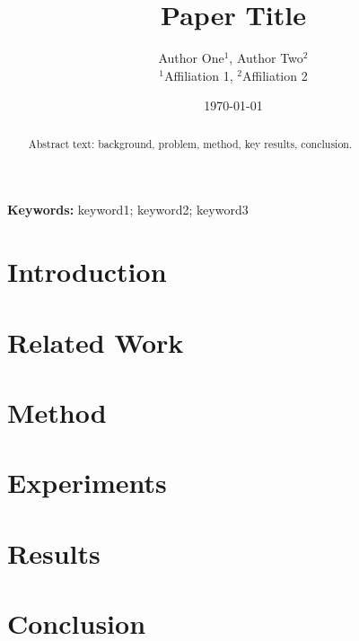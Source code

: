 \documentclass[11pt,a4paper]{article}
\begin{document}
\title{Paper Title}
\author{Author One$^{1}$, Author Two$^{2}$ \\ \small $^{1}$Affiliation 1, $^{2}$Affiliation 2}
\date{\today}
\maketitle

\begin{abstract}
Abstract text: background, problem, method, key results, conclusion.
\end{abstract}

\noindent\textbf{Keywords:} keyword1; keyword2; keyword3

\section{Introduction}

\section{Related Work}

\section{Method}

\section{Experiments}

\section{Results}

\section{Conclusion}


\end{document}

